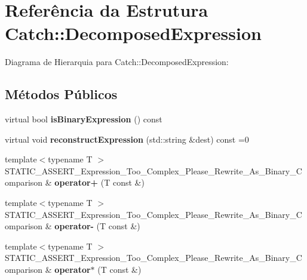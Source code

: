 \hypertarget{structCatch_1_1DecomposedExpression}{}\section{Referência da Estrutura Catch\+:\+:Decomposed\+Expression}
\label{structCatch_1_1DecomposedExpression}


Diagrama de Hierarquia para Catch\+:\+:Decomposed\+Expression\+:
\subsection*{Métodos Públicos}
\begin{DoxyCompactItemize}
\item 
virtual bool {\bfseries is\+Binary\+Expression} () const \hypertarget{structCatch_1_1DecomposedExpression_af08ea5b188f04b0f441d8e4cdc340452}{}\label{structCatch_1_1DecomposedExpression_af08ea5b188f04b0f441d8e4cdc340452}

\item 
virtual void {\bfseries reconstruct\+Expression} (std\+::string \&dest) const =0\hypertarget{structCatch_1_1DecomposedExpression_a9ce7f356dc96f11f80e40c82f5aa7e55}{}\label{structCatch_1_1DecomposedExpression_a9ce7f356dc96f11f80e40c82f5aa7e55}

\item 
{\footnotesize template$<$typename T $>$ }\\S\+T\+A\+T\+I\+C\+\_\+\+A\+S\+S\+E\+R\+T\+\_\+\+Expression\+\_\+\+Too\+\_\+\+Complex\+\_\+\+Please\+\_\+\+Rewrite\+\_\+\+As\+\_\+\+Binary\+\_\+\+Comparison \& {\bfseries operator+} (T const \&)\hypertarget{structCatch_1_1DecomposedExpression_aa2ce96ce31fef4afb21861bc0276edb9}{}\label{structCatch_1_1DecomposedExpression_aa2ce96ce31fef4afb21861bc0276edb9}

\item 
{\footnotesize template$<$typename T $>$ }\\S\+T\+A\+T\+I\+C\+\_\+\+A\+S\+S\+E\+R\+T\+\_\+\+Expression\+\_\+\+Too\+\_\+\+Complex\+\_\+\+Please\+\_\+\+Rewrite\+\_\+\+As\+\_\+\+Binary\+\_\+\+Comparison \& {\bfseries operator-\/} (T const \&)\hypertarget{structCatch_1_1DecomposedExpression_aff39fb5d060abbd018c83b998d32c366}{}\label{structCatch_1_1DecomposedExpression_aff39fb5d060abbd018c83b998d32c366}

\item 
{\footnotesize template$<$typename T $>$ }\\S\+T\+A\+T\+I\+C\+\_\+\+A\+S\+S\+E\+R\+T\+\_\+\+Expression\+\_\+\+Too\+\_\+\+Complex\+\_\+\+Please\+\_\+\+Rewrite\+\_\+\+As\+\_\+\+Binary\+\_\+\+Comparison \& {\bfseries operator$\ast$} (T const \&)\hypertarget{structCatch_1_1DecomposedExpression_afb5527e8e3cb8edca5113ec9801249d8}{}\label{structCatch_1_1DecomposedExpression_afb5527e8e3cb8edca5113ec9801249d8}


\end{DoxyCompactItemize}
